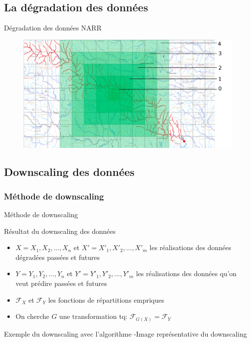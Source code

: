 \documentclass{beamer}
\numberwithin{equation}{section}
\begin{document}
	\subsection{La dégradation des données}
	\begin{frame}{Dégradation des données NARR}
		\begin{figure}[H]
			\begin{center}
				\includegraphics[scale=0.2]{Little_Washita_deg.png}
			\end{center}
			\label{fig-Little-Washita-deg}
		\end{figure}
	\end{frame}
	\subsection{Downscaling des données}
	
	\subsubsection{Méthode de downscaling}
	\begin{frame}{Méthode de downscaling}
		\begin{minipage}[b]{0.5\linewidth}
			\begin{block}{Résultat du downscaling des données}
				\begin{itemize}
					\item $X=X_1,X_2,...,X_n$ et $X'=X'_1,X'_2,...,X'_m$ les réalisations des données dégradées passées et futures
					\item $Y=Y_1,Y_2,...,Y_n$ et $Y'=Y'_1,Y'_2,...,Y'_m$ les réalisations des données qu'on veut prédire passées et futures
					\item $\mathcal{F}_{X}$ et $\mathcal{F}_{Y}$ les fonctions de répartitions empriques 
					\item On cherche $G$ une transformation tq: $\mathcal{F}_{G(X)}= \mathcal{F}_Y$
				\end{itemize} 
			\end{block}
		\end{minipage}\hfill
		\begin{minipage}[b]{0.4\linewidth}
			\begin{block}{Exemple du downscaling avec l'algorithme }
				-Image représentative du downscaling
			\end{block}
		\end{minipage}
	\end{frame}
\end{document}
